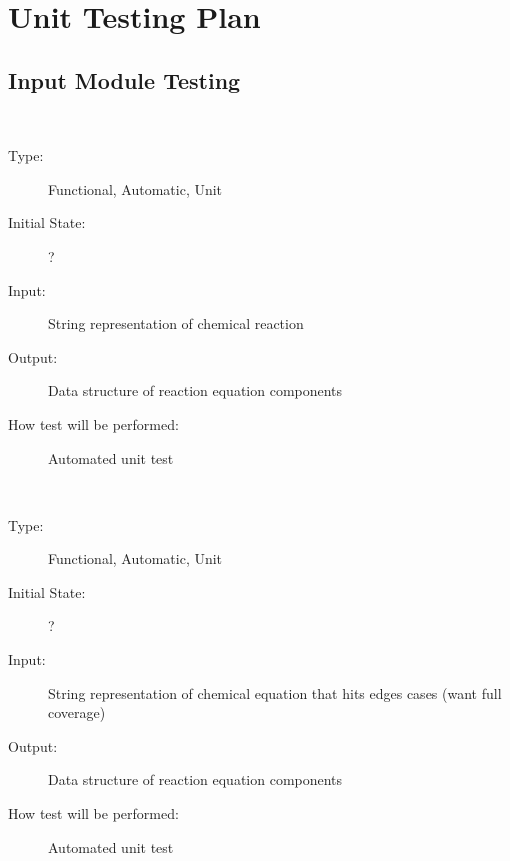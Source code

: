 \documentclass[12pt, titlepage]{article}
\newcounter{testnum} %
\begin{document}
\newpage		
\section{Unit Testing Plan}
		
\subsection{Input Module Testing}

\begin{addmargin}[2em]{0em}
\\
\begin{addmargin}[2em]{0em}
\begin{description}
\item[Type:] Functional, Automatic, Unit
					
\item[Initial State:] ?
					
\item[Input:] String representation of chemical reaction
					
\item[Output:] Data structure of reaction equation components
					
\item[How test will be performed:] Automated unit test \\
\end{description}
\end{addmargin}			
\\
\begin{addmargin}[2em]{0em}
\begin{description}
\item[Type:] Functional, Automatic, Unit
					
\item[Initial State:] ?
					
\item[Input:] String representation of chemical equation that hits edges cases 
  (want full coverage)
					
\item[Output:] Data structure of reaction equation components
					
\item[How test will be performed:] Automated unit test\\
\end{description}
\end{addmargin}
\noindent {}\\


\end{addmargin}
\end{document}
